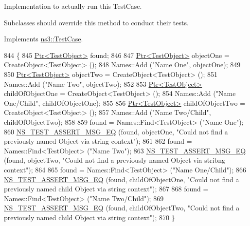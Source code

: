 Implementation to actually run this Test\+Case. 

Subclasses should override this method to conduct their tests. 

Implements \hyperlink{classns3_1_1TestCase_a8ff74680cf017ed42011e4be51917a24}{ns3\+::\+Test\+Case}.


\begin{DoxyCode}
844 \{
845   \hyperlink{classns3_1_1Ptr}{Ptr<TestObject>} found;
846 
847   \hyperlink{classns3_1_1Ptr}{Ptr<TestObject>} objectOne = CreateObject<TestObject> ();
848   Names::Add (\textcolor{stringliteral}{"Name One"}, objectOne);
849 
850   \hyperlink{classns3_1_1Ptr}{Ptr<TestObject>} objectTwo = CreateObject<TestObject> ();
851   Names::Add (\textcolor{stringliteral}{"Name Two"}, objectTwo);
852 
853   \hyperlink{classns3_1_1Ptr}{Ptr<TestObject>} childOfObjectOne = CreateObject<TestObject> ();
854   Names::Add (\textcolor{stringliteral}{"Name One/Child"}, childOfObjectOne);
855 
856   \hyperlink{classns3_1_1Ptr}{Ptr<TestObject>} childOfObjectTwo = CreateObject<TestObject> ();
857   Names::Add (\textcolor{stringliteral}{"Name Two/Child"}, childOfObjectTwo);
858 
859   found = Names::Find<TestObject> (\textcolor{stringliteral}{"Name One"});
860   \hyperlink{group__testing_ga2a9d78cffb3db8e867c35fff0b698cf5}{NS\_TEST\_ASSERT\_MSG\_EQ} (found, objectOne, \textcolor{stringliteral}{"Could not find a previously named Object
       via string context"});
861 
862   found = Names::Find<TestObject> (\textcolor{stringliteral}{"Name Two"});
863   \hyperlink{group__testing_ga2a9d78cffb3db8e867c35fff0b698cf5}{NS\_TEST\_ASSERT\_MSG\_EQ} (found, objectTwo, \textcolor{stringliteral}{"Could not find a previously named Object
       via stribng context"});
864 
865   found = Names::Find<TestObject> (\textcolor{stringliteral}{"Name One/Child"});
866   \hyperlink{group__testing_ga2a9d78cffb3db8e867c35fff0b698cf5}{NS\_TEST\_ASSERT\_MSG\_EQ} (found, childOfObjectOne, \textcolor{stringliteral}{"Could not find a previously named
       child Object via string context"});
867 
868   found = Names::Find<TestObject> (\textcolor{stringliteral}{"Name Two/Child"});
869   \hyperlink{group__testing_ga2a9d78cffb3db8e867c35fff0b698cf5}{NS\_TEST\_ASSERT\_MSG\_EQ} (found, childOfObjectTwo, \textcolor{stringliteral}{"Could not find a previously named
       child Object via string context"});
870 \}
\end{DoxyCode}
